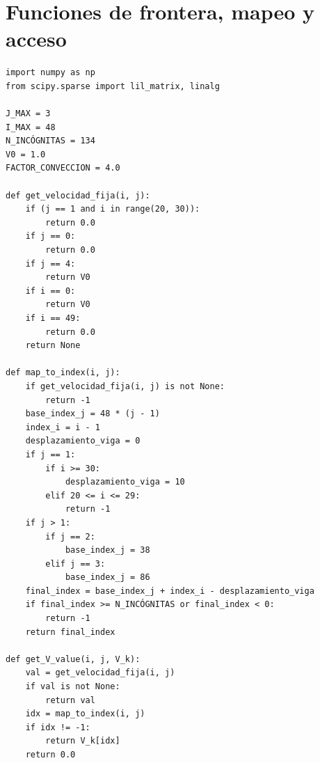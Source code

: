 \documentclass[12pt,a4paper]{report}
\theoremstyle{definition}
\begin{document}
\section{Funciones de frontera, mapeo y acceso}
\begin{lstlisting}[style=mypython]
import numpy as np
from scipy.sparse import lil_matrix, linalg

J_MAX = 3
I_MAX = 48
N_INCÓGNITAS = 134
V0 = 1.0
FACTOR_CONVECCION = 4.0

def get_velocidad_fija(i, j):
    if (j == 1 and i in range(20, 30)):
        return 0.0
    if j == 0:
        return 0.0
    if j == 4:
        return V0
    if i == 0:
        return V0
    if i == 49:
        return 0.0
    return None

def map_to_index(i, j):
    if get_velocidad_fija(i, j) is not None:
        return -1
    base_index_j = 48 * (j - 1)
    index_i = i - 1
    desplazamiento_viga = 0
    if j == 1:
        if i >= 30:
            desplazamiento_viga = 10
        elif 20 <= i <= 29:
            return -1
    if j > 1:
        if j == 2:
            base_index_j = 38
        elif j == 3:
            base_index_j = 86
    final_index = base_index_j + index_i - desplazamiento_viga
    if final_index >= N_INCÓGNITAS or final_index < 0:
        return -1
    return final_index

def get_V_value(i, j, V_k):
    val = get_velocidad_fija(i, j)
    if val is not None:
        return val
    idx = map_to_index(i, j)
    if idx != -1:
        return V_k[idx]
    return 0.0
\end{lstlisting}
\end{document}
